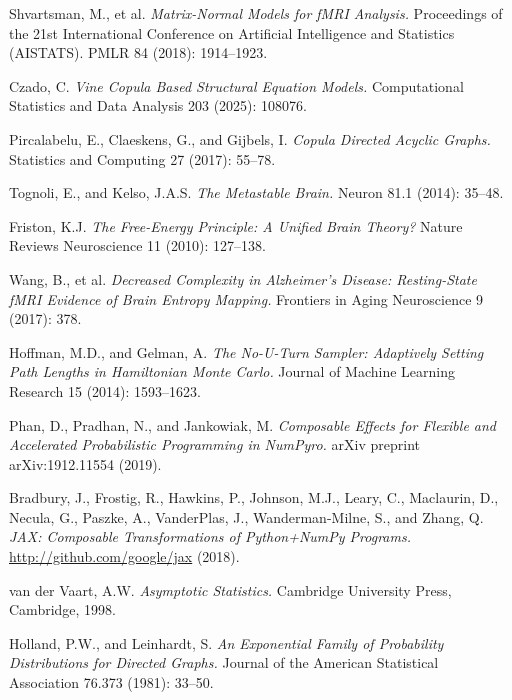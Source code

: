 Shvartsman, M., et al.
\textit{Matrix-Normal Models for fMRI Analysis.}
Proceedings of the 21st International Conference on Artificial Intelligence and Statistics (AISTATS). PMLR 84 (2018): 1914--1923.


Czado, C.
\textit{Vine Copula Based Structural Equation Models.}
Computational Statistics and Data Analysis 203 (2025): 108076.

Pircalabelu, E., Claeskens, G., and Gijbels, I.
\textit{Copula Directed Acyclic Graphs.}
Statistics and Computing 27 (2017): 55--78.


Tognoli, E., and Kelso, J.A.S.
\textit{The Metastable Brain.}
Neuron 81.1 (2014): 35--48.

Friston, K.J.
\textit{The Free-Energy Principle: A Unified Brain Theory?}
Nature Reviews Neuroscience 11 (2010): 127--138.

Wang, B., et al.
\textit{Decreased Complexity in Alzheimer's Disease: Resting-State fMRI Evidence of Brain Entropy Mapping.}
Frontiers in Aging Neuroscience 9 (2017): 378.


Hoffman, M.D., and Gelman, A.
\textit{The No-U-Turn Sampler: Adaptively Setting Path Lengths in Hamiltonian Monte Carlo.}
Journal of Machine Learning Research 15 (2014): 1593--1623.

Phan, D., Pradhan, N., and Jankowiak, M.
\textit{Composable Effects for Flexible and Accelerated Probabilistic Programming in NumPyro.}
arXiv preprint arXiv:1912.11554 (2019).

Bradbury, J., Frostig, R., Hawkins, P., Johnson, M.J., Leary, C., Maclaurin, D., Necula, G., Paszke, A., VanderPlas, J., Wanderman-Milne, S., and Zhang, Q.
\textit{JAX: Composable Transformations of Python+NumPy Programs.}
\url{http://github.com/google/jax} (2018).


van der Vaart, A.W.
\textit{Asymptotic Statistics.}
Cambridge University Press, Cambridge, 1998.

Holland, P.W., and Leinhardt, S.
\textit{An Exponential Family of Probability Distributions for Directed Graphs.}
Journal of the American Statistical Association 76.373 (1981): 33--50.
